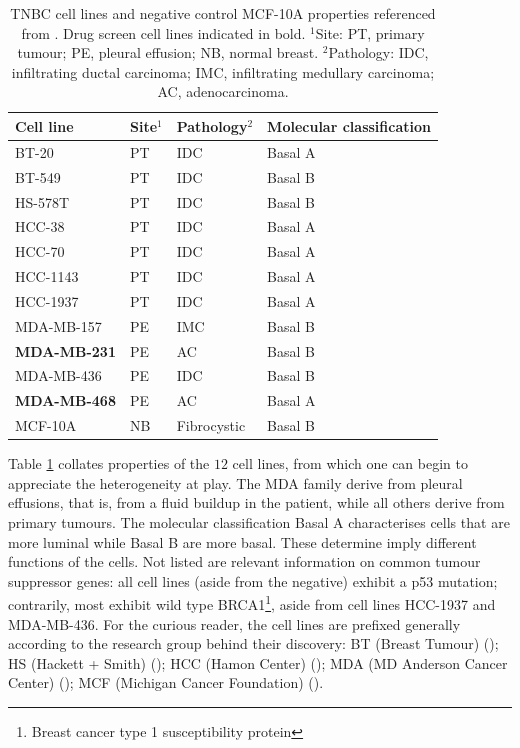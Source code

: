 \begin{table}
\begin{center}
\begin{tabular}{|p{3cm}|p{1.5cm}|p{2.5cm}|p{3cm}|}
\hline
Cell line & Site$^1$ & Pathology$^2$ & Molecular classification \\
\hline
BT-20 & PT & IDC & Basal A\\
BT-549 & PT & IDC & Basal B\\
\hline
HS-578T & PT & IDC & Basal B\\
\hline
HCC-38 & PT & IDC & Basal A\\
HCC-70 & PT & IDC & Basal A\\
HCC-1143 & PT & IDC & Basal A\\
HCC-1937 & PT & IDC & Basal A\\
\hline
MDA-MB-157 & PE & IMC & Basal B\\
\textbf{MDA-MB-231} & PE & AC & Basal B\\
MDA-MB-436 & PE & IDC & Basal B\\
\textbf{MDA-MB-468} & PE & AC & Basal A\\
\hline
MCF-10A & NB & Fibrocystic & Basal B\\
\hline
\end{tabular}
\caption{TNBC cell lines and negative control MCF-10A properties referenced from \cite{chavez2010triple}. Drug screen cell lines indicated in bold. $^1$Site: PT, primary tumour; PE, pleural effusion; NB, normal breast. $^2$Pathology: IDC, infiltrating ductal carcinoma; IMC, infiltrating medullary carcinoma; AC, adenocarcinoma.}
\label{table:cell_lines_molecular}
\end{center}
\end{table}

Table \ref{table:cell_lines_molecular} collates properties of the $12$ cell lines, from which one can begin to appreciate the heterogeneity at play. The MDA family derive from pleural effusions, that is, from a fluid buildup in the patient, while all others derive from primary tumours. The molecular classification Basal A characterises cells that are more luminal while Basal B are more basal\cite{dai2017breast}. These determine imply different functions of the cells. Not listed are relevant information on common tumour suppressor genes: all cell lines (aside from the negative) exhibit a p53 mutation; contrarily, most exhibit wild type BRCA1\footnote{Breast cancer type 1 susceptibility protein}, aside from cell lines HCC-1937 and MDA-MB-436. For the curious reader, the cell lines are prefixed generally according to the research group behind their discovery: BT (Breast Tumour) (\cite{lasfargues1958cultivation}); HS (Hackett + Smith) (\cite{hackett1977two}); HCC (Hamon Center) (\cite{gazdar1998characterization}); MDA (MD Anderson Cancer Center) (\cite{brinkley1980variations}); MCF (Michigan Cancer Foundation) (\cite{soule1990isolation}).

